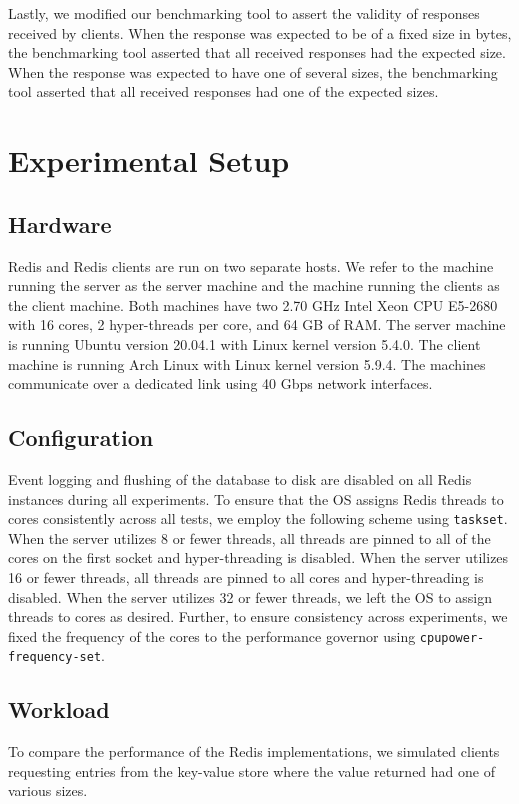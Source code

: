 \documentclass[sigconf, screen]{acmart}
\newcommand{\inlinecode}[1]{\texttt{#1}}
\begin{document}
Lastly, we modified our benchmarking tool to assert the validity of responses received by clients.
When the response was expected to be of a fixed size in bytes, the benchmarking tool asserted that all received responses had the expected size.
When the response was expected to have one of several sizes, the benchmarking tool asserted that all received responses had one of the expected sizes.

\section{Experimental Setup}

\subsection{Hardware}
Redis and Redis clients are run on two separate hosts.
We refer to the machine running the server as the server machine and the machine running the clients as the client machine.
Both machines have two 2.70 GHz Intel Xeon CPU E5-2680 with 16 cores, 2 hyper-threads per core, and 64 GB of RAM.
The server machine is running Ubuntu version 20.04.1 with Linux kernel version 5.4.0.
The client machine is running Arch Linux with Linux kernel version 5.9.4.
The machines communicate over a dedicated link using 40 Gbps network interfaces.

\subsection{Configuration}
Event logging and flushing of the database to disk are disabled on all Redis instances during all experiments.
To ensure that the OS assigns Redis threads to cores consistently across all tests, we employ the following scheme using \inlinecode{taskset}.
When the server utilizes 8 or fewer threads, all threads are pinned to all of the cores on the first socket and hyper-threading is disabled.
When the server utilizes 16 or fewer threads, all threads are pinned to all cores and hyper-threading is disabled.
When the server utilizes 32 or fewer threads, we left the OS to assign threads to cores as desired.
Further, to ensure consistency across experiments, we fixed the frequency of the cores to the performance governor using \inlinecode{cpupower-frequency-set}.

\subsection{Workload}
To compare the performance of the Redis implementations, we simulated clients requesting entries from the key-value store where the value returned had one of various sizes.
\end{document}
